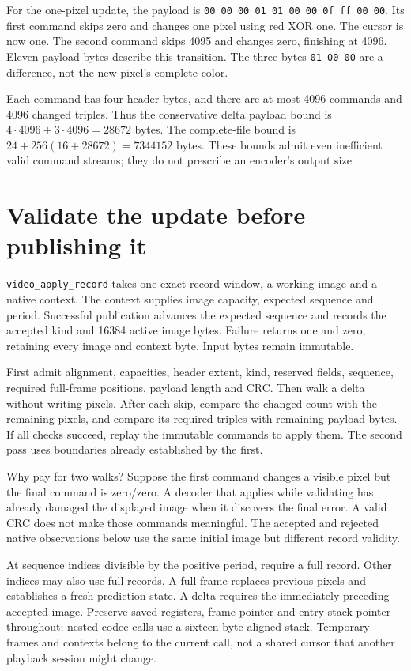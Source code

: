 For the one-pixel update, the payload is
\texttt{00 00 00 01 01 00 00 0f ff 00 00}. Its first command skips zero and
changes one pixel using red XOR one. The cursor is now one. The second command
skips 4095 and changes zero, finishing at 4096. Eleven payload bytes describe
this transition. The three bytes \texttt{01 00 00} are a difference, not the
new pixel's complete color.

Each command has four header bytes, and there are at most 4096 commands and
4096 changed triples. Thus the conservative delta payload bound is
$4\cdot4096+3\cdot4096=28672$ bytes. The complete-file bound is
$24+256(16+28672)=7344152$ bytes. These bounds admit even inefficient valid
command streams; they do not prescribe an encoder's output size.

\section{Validate the update before publishing it}

\texttt{video\_apply\_record} takes one exact record window, a working image
and a native context. The context supplies image capacity, expected sequence
and period. Successful publication advances the expected sequence and records
the accepted kind and 16384 active image bytes. Failure returns one and zero,
retaining every image and context byte. Input bytes remain immutable.

First admit alignment, capacities, header extent, kind, reserved fields,
sequence, required full-frame positions, payload length and CRC. Then walk a
delta without writing pixels. After each skip, compare the changed count with
the remaining pixels, and compare its required triples with remaining payload
bytes. If all checks succeed, replay the immutable commands to apply them.
The second pass uses boundaries already established by the first.

Why pay for two walks? Suppose the first command changes a visible pixel but
the final command is zero/zero. A decoder that applies while validating has
already damaged the displayed image when it discovers the final error. A valid
CRC does not make those commands meaningful. The accepted and rejected native
observations below use the same initial image but different record validity.



At sequence indices divisible by the positive period, require a full record.
Other indices may also use full records. A full frame replaces previous pixels
and establishes a fresh prediction state. A delta requires the immediately
preceding accepted image. Preserve saved registers, frame pointer and entry
stack pointer throughout; nested codec calls use a sixteen-byte-aligned stack.
Temporary frames and contexts belong to the current call, not a shared cursor
that another playback session might change.

